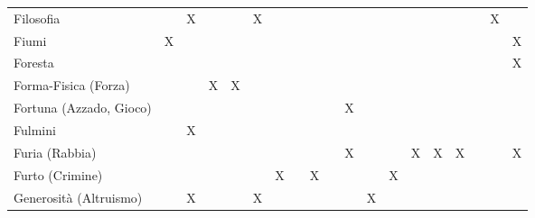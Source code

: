 \documentclass[10pt,a3paper]{memoir}
\begin{document}
\begin{table}[h]
\begin{tabular}{l|c|c|c|c|c|c|c|c|c|c|c|c|c|c|c|c|c|c}
Filosofia &  & X &  &  & X &  &  &  &  &  &  &  &  &  &  &  & X &  \\
Fiumi & X &  &  &  &  &  &  &  &  &  &  &  &  &  &  &  &  & X \\
Foresta &  &  &  &  &  &  &  &  &  &  &  &  &  &  &  &  &  & X \\
Forma-Fisica (Forza) &  &  & X & X &  &  &  &  &  &  &  &  &  &  &  &  &  &  \\
Fortuna (Azzado, Gioco) &  &  &  &  &  &  &  &  &  & X &  &  &  &  &  &  &  &  \\
Fulmini &  & X &  &  &  &  &  &  &  &  &  &  &  &  &  &  &  &  \\
Furia (Rabbia) &  &  &  &  &  &  &  &  &  & X &  &  & X & X & X &  &  & X \\
Furto (Crimine) &  &  &  &  &  & X &  & X &  &  &  & X &  &  &  &  &  &  \\
Generosit\`{a} (Altruismo) &  & X &  &  & X &  &  &  &  &  & X &  &  &  &  &  &  &  \\
\bottomrule
\end{tabular}
\end{table}
\end{document}
